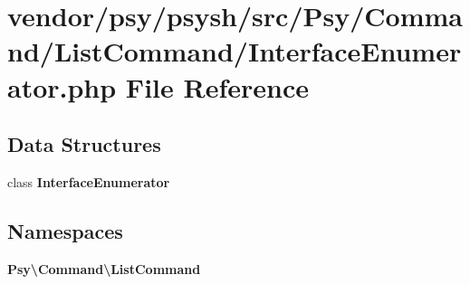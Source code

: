 \section{vendor/psy/psysh/src/\+Psy/\+Command/\+List\+Command/\+Interface\+Enumerator.php File Reference}
\label{_interface_enumerator_8php}
\subsection*{Data Structures}
\begin{DoxyCompactItemize}
\item 
class {\bf Interface\+Enumerator}
\end{DoxyCompactItemize}
\subsection*{Namespaces}
\begin{DoxyCompactItemize}
\item 
 {\bf Psy\textbackslash{}\+Command\textbackslash{}\+List\+Command}
\end{DoxyCompactItemize}
